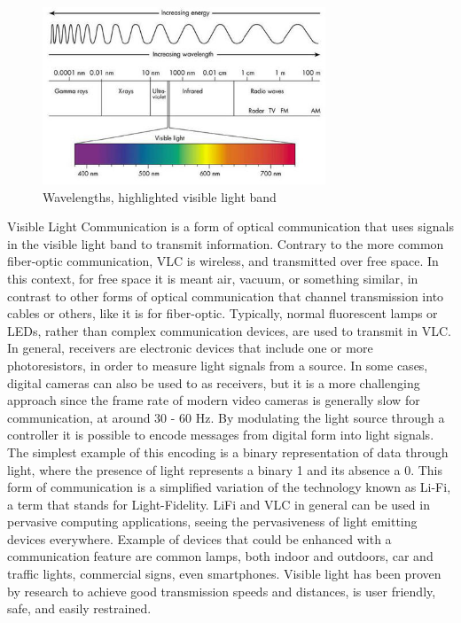 \label{sectionVLC}
\begin{figure}[hbt]
	\centering
  \includegraphics[height=200px]{img/wavelengths}
  \caption{Wavelengths, highlighted visible light band}
  \label{fig:wavelength}
\end{figure}

Visible Light Communication is a form of optical communication that uses signals in the visible light band to transmit information.
Contrary to the more common fiber-optic communication, VLC is wireless, and transmitted over free space.
In this context, for free space it is meant air, vacuum, or something similar, in contrast to other forms of optical communication that channel transmission into cables or others, like it is for fiber-optic.
Typically, normal fluorescent lamps or LEDs, rather than complex communication devices,  are used to transmit in VLC.
In general, receivers are electronic devices that include one or more photoresistors, in order to measure light signals from a source.
In some cases, digital cameras can also be used to as receivers, but it is a more challenging approach since the frame rate of modern video cameras is generally slow for communication, at around 30 - 60 Hz.
By modulating the light source through a controller it is possible to encode messages from digital form into light signals.
The simplest example of this encoding is a binary representation of data through light, where the presence of light represents a binary 1 and its absence a 0.
This form of communication is a simplified variation of the technology known as Li-Fi, a term that stands for Light-Fidelity.
LiFi and VLC in general can be used in pervasive computing applications, seeing the pervasiveness of light emitting devices everywhere.
Example of devices that could be enhanced with a communication feature are common lamps, both indoor and outdoors, car and traffic lights, commercial signs, even smartphones.
Visible light has been proven by research to achieve good transmission speeds and distances, is user friendly, safe, and easily restrained. 
